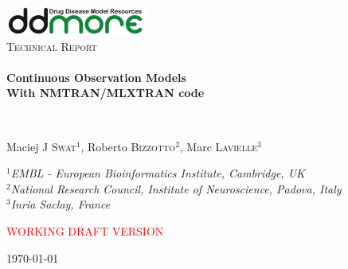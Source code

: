 \begin{titlepage}
\begin{center}

\includegraphics[width=0.35\textwidth]{./logo/ddmore_logo}~\\[1cm]

%
\textsc{\Large Technical Report}\\[0.5cm]

\HRule \\[0.4cm]
{ \huge \bfseries Continuous Observation Models \\[0.4cm] }
{ \large \bfseries With NMTRAN/MLXTRAN code \\[0.4cm] }

\HRule \\[1.5cm]


\begin{minipage}{0.9\textwidth}
\begin{flushleft} \large
Maciej J \textsc{Swat}$^1$, Roberto \textsc{Bizzotto}$^2$, Marc \textsc{Lavielle}$^3$ \\
\end{flushleft}
\end{minipage}


\bigskip
\begin{minipage}{0.9\textwidth}
\begin{flushleft} \large
$^1$\emph{EMBL - European Bioinformatics Institute, Cambridge, UK} \\ 
$^2$\emph{National Research Council, Institute of Neuroscience, Padova, Italy} \\
$^3$\emph{Inria Saclay, France}
\end{flushleft}
\end{minipage}


\bigskip
\vfill

\textcolor{red}{WORKING DRAFT VERSION}

\vfill

{\large \today \\}

\end{center}
\end{titlepage}